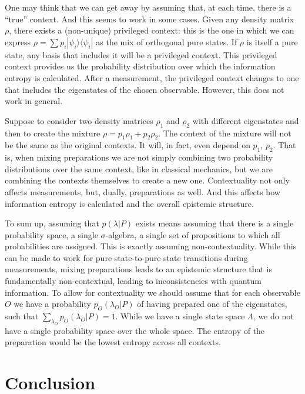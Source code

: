 \documentclass[twocolumn,prl,floatfix,superscriptaddress]{revtex4-2}
\begin{document}
One may think that we can get away by assuming that, at each time, there is a ``true'' context. And this seems to work in some cases. Given any density matrix $\rho$, there exists a (non-unique) privileged context: this is the one in which we can express $\rho = \sum p_i |\psi_i \rangle \langle \psi_i|$ as the mix of orthogonal pure states. If $\rho$ is itself a pure state, any basis that includes it will be a privileged context. This privileged context provides us the probability distribution over which the information entropy is calculated. After a measurement, the privileged context changes to one that includes the eigenstates of the chosen observable. However, this does not work in general.

Suppose to consider two density matrices $\rho_1$ and $\rho_2$ with different eigenstates and then to create the mixture $\rho = p_1 \rho_1 + p_2 \rho_2$. The context of the mixture will not be the same as the original contexts. It will, in fact, even depend on $p_1$, $p_2$. That is, when mixing preparations we are not simply combining two probability distributions over the same context, like in classical mechanics, but we are combining the contexts themselves to create a new one. Contextuality not only affects measurements, but, dually, preparations as well. And this affects how information entropy is calculated and the overall epistemic structure.

To sum up, assuming that $p(\lambda|P)$ exists means assuming that there is a single probability space, a single $\sigma$-algebra, a single set of propositions to which all probabilities are assigned. This is exactly assuming non-contextuality. While this can be made to work for pure state-to-pure state transitions during measurements, mixing preparations leads to an epistemic structure that is fundamentally non-contextual, leading to inconsistencies with quantum information. To allow for contextuality we should assume that for each observable $O$ we have a probability $p_O(\lambda_O|P)$ of having prepared one of the eigenstates, such that $\sum_{\lambda_O} p_O(\lambda_O|P) = 1$. While we have a single state space $\Lambda$, we do not have a single probability space over the whole space. The entropy of the preparation would be the lowest entropy across all contexts.


\section{Conclusion}


%

\end{document}
